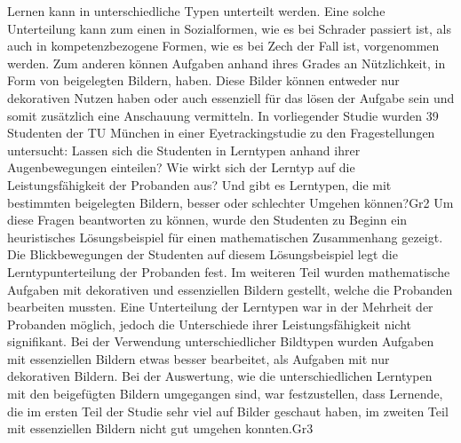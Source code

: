 Lernen kann in unterschiedliche Typen unterteilt werden. Eine solche Unterteilung kann zum einen in Sozialformen, wie es bei Schrader passiert ist, als auch in kompetenzbezogene Formen, wie es bei Zech der Fall ist, vorgenommen werden. Zum anderen können Aufgaben anhand ihres Grades an Nützlichkeit, in Form von beigelegten Bildern, haben. Diese Bilder können entweder nur dekorativen Nutzen haben oder auch essenziell für das lösen der Aufgabe sein und somit zusätzlich eine Anschauung vermitteln. In vorliegender Studie wurden 39 Studenten der TU München in einer Eyetrackingstudie zu den Fragestellungen untersucht: Lassen sich die Studenten in Lerntypen anhand ihrer Augenbewegungen einteilen? Wie wirkt sich der Lerntyp auf die Leistungsfähigkeit der Probanden aus? Und gibt es Lerntypen, die mit bestimmten beigelegten Bildern, besser oder schlechter Umgehen können?\gls{Gr2}  
Um diese Fragen beantworten zu können, wurde den Studenten zu Beginn ein heuristisches Lösungsbeispiel für einen mathematischen Zusammenhang gezeigt. Die Blickbewegungen der Studenten auf diesem Lösungsbeispiel legt die Lerntypunterteilung der Probanden fest. Im weiteren Teil wurden mathematische Aufgaben mit dekorativen und essenziellen Bildern gestellt, welche die Probanden bearbeiten mussten. Eine Unterteilung der Lerntypen war in der Mehrheit der Probanden möglich, jedoch die Unterschiede ihrer Leistungsfähigkeit nicht signifikant. Bei der Verwendung unterschiedlicher Bildtypen wurden Aufgaben mit essenziellen Bildern etwas besser bearbeitet, als Aufgaben mit nur dekorativen Bildern. Bei der Auswertung, wie die unterschiedlichen Lerntypen mit den beigefügten Bildern umgegangen sind, war festzustellen, dass Lernende, die im ersten Teil der Studie sehr viel auf Bilder geschaut haben, im zweiten Teil mit essenziellen Bildern nicht gut umgehen konnten.\gls{Gr3}


\tableofcontents %










\printbibliography
\clearpage

\listoffigures %

\printacronyms[title={Abkürzungsverzeichnis}] %

\listoftables %

\onehalfspacing

